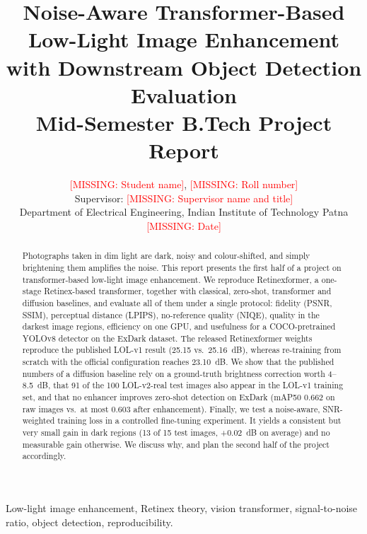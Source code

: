 \documentclass[journal]{IEEEtran}
\newcommand{\missing}[1]{\textcolor{red}{[MISSING: #1]}}
\begin{document}
\title{Noise-Aware Transformer-Based Low-Light Image Enhancement with Downstream Object Detection Evaluation\\
\large Mid-Semester B.Tech Project Report}

\author{\missing{Student name}, \missing{Roll number}\\
Supervisor: \missing{Supervisor name and title}\\
Department of Electrical Engineering, Indian Institute of Technology Patna\\
\missing{Date}}

\maketitle

\begin{abstract}
Photographs taken in dim light are dark, noisy and colour-shifted, and simply brightening them amplifies the noise.
This report presents the first half of a project on transformer-based low-light image enhancement. We reproduce
Retinexformer, a one-stage Retinex-based transformer, together with classical, zero-shot, transformer and diffusion
baselines, and evaluate all of them under a single protocol: fidelity (PSNR, SSIM), perceptual distance (LPIPS),
no-reference quality (NIQE), quality in the darkest image regions, efficiency on one GPU, and usefulness for a
COCO-pretrained YOLOv8 detector on the ExDark dataset. The released Retinexformer weights reproduce the published
LOL-v1 result (25.15 vs.\ 25.16~dB), whereas re-training from scratch with the official configuration reaches
23.10~dB. We show that the published numbers of a diffusion baseline rely on a ground-truth brightness correction
worth 4--8.5~dB, that 91 of the 100 LOL-v2-real test images also appear in the LOL-v1 training set, and that no
enhancer improves zero-shot detection on ExDark (mAP50 0.662 on raw images vs.\ at most 0.603 after enhancement).
Finally, we test a noise-aware, SNR-weighted training loss in a controlled fine-tuning experiment. It yields a
consistent but very small gain in dark regions (13 of 15 test images, +0.02~dB on average) and no measurable gain
otherwise. We discuss why, and plan the second half of the project accordingly.
\end{abstract}

\begin{IEEEkeywords}
Low-light image enhancement, Retinex theory, vision transformer, signal-to-noise ratio, object detection, reproducibility.
\end{IEEEkeywords}
\end{document}
